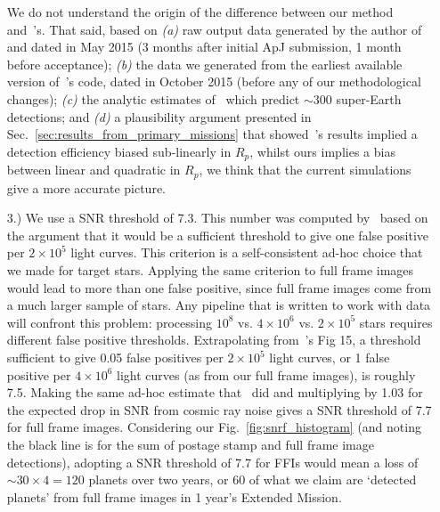 \begin{itemize}
	We do not understand the origin of the difference between our method and~'s.
	That said, based on 
	\textit{(a)} raw output data generated by the author of~ and dated in May 2015 (3 months after initial ApJ submission, 1 month before acceptance); 
	\textit{(b)} the data we generated from the earliest available version of~'s code, dated in October 2015 (before any of our methodological changes); 
	\textit{(c)} the analytic estimates of~\citet{winn_searchable_2013} which predict $\sim300$ super-Earth detections;
	and \textit{(d)} a plausibility argument presented in Sec.~\ref{sec:results_from_primary_missions} that showed~'s results implied a detection efficiency biased sub-linearly in $R_p$, whilst ours implies a bias between linear and quadratic in $R_p$,
	we think that the current simulations give a more accurate picture.
	
	\item [3.) We use a SNR threshold of 7.3.] This number was computed by~ based on the argument that it would be a sufficient threshold to give one false positive per $2\times10^5$ light curves.
	This criterion is a self-consistent ad-hoc choice that we made for target stars.
	Applying the same criterion to full frame images would lead to more than one false positive, since full frame images come from a much larger sample of stars.
	Any pipeline that is written to work with \tess data will confront this problem:
	processing $10^8$ vs. $4\times10^6$ vs. $2\times10^5$ stars requires different false positive thresholds.
	Extrapolating from~'s Fig 15, a threshold sufficient to give 0.05 false positives per $2\times10^5$ light curves, or 1 false positive per $4\times10^6$ light curves (as from our full frame images), is roughly 7.5.
	Making the same ad-hoc estimate that~ did and multiplying by 1.03 for the expected drop in SNR from cosmic ray noise gives a SNR threshold of 7.7 for full frame images.
	Considering our Fig.~\ref{fig:snrf_histogram} (and noting the black line is for the sum of postage stamp and full frame image detections), adopting a SNR threshold of 7.7 for FFIs would mean a loss of $\sim30\times4=120$ planets over two years, or 60 of what we claim are `detected planets' from full frame images in 1 year's Extended Mission.	
	

\end{itemize}
